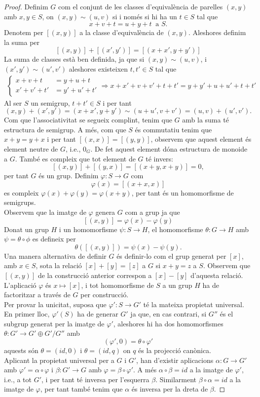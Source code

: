 \begin{proof}
Definim $G$ com el conjunt de les classes d'equivalència de parelles $(x,y)$ amb $x,y\in S$, on $(x,y) \sim (u,v)$ si i només si hi ha un $t\in S$ tal que 
$$
x+v+t = u+y+t \ \text{ a } S .
$$
Denotem per $ [(x,y)] $ a la classe d'equivalència de $(x,y)$. Aleshores definim la suma per
$$
[(x,y)]+[(x',y')]=[(x+x',y+y')]
$$
La suma de classes està ben definida, ja que si $(x,y)\sim (u,v)$,  i $(x',y') \sim (u',v')$ aleshores existeixen $t,t' \in S$ tal que 
\begin{eqnarray*}
\begin{cases}
x+v+t&=y+u+t \\ 
x'+v'+t'&=y'+u'+t'
\end{cases}
\Rightarrow 
x+x'+v+v'+t+t'=y+y'+u+u'+t+t'
\end{eqnarray*}
 Al ser $S$ un semigrup, $t+t'\in S$ i per tant
 $$(x,y)+(x',y')=(x+x',y+y')\sim (u+u',v+v') = (u,v)+(u',v').$$
\noindent Com que l'associativitat se segueix complint, tenim que $G$ amb la suma té estructura de semigrup. A més, com que $S$ és commutatiu tenim que $x+y=y+x$ i per tant $[(x,x)]=[(y,y)]$, observem que aquest element és element neutre de $G$, i.e., $0_G$. De fet aquest element dóna estructura de monoide a $G$.
També es compleix que tot element de $G$ té invers:
$$
[(x,y)]+ [(y,x)] = [(x+y,x+y)] = 0,
$$
per tant $G$ és un grup. Definim $\varphi: S\rightarrow G$ com
$$
\varphi(x)=[(x+x,x)]
$$
es compleix $\varphi(x)+\varphi(y)=\varphi(x+y)$, per tant és un homomorfisme de semigrups. 
\\ Observem que la imatge de $\varphi$ genera $G$ com a grup ja que 
$$
[(x,y)]=\varphi(x)-\varphi(y)
$$
 Donat un grup $H$ i un homomorfisme $\psi: S\rightarrow H$, el homomorfisme $\theta: G\rightarrow H$ amb $\psi = \theta \circ \phi$ es defineix per
$$
\theta([(x,y)])=\psi(x)-\psi(y).
$$
\indent  Una manera alternativa de definir $G$ és definir-lo com el grup generat per $[x]$, amb $x\in S$, sota la relació $[x]+[y]=[z]$ a $G$ si $x+y=z$ a $S$. Observem que $[(x,y)]$ de la construcció anterior correspon a $[x]-[y]$ d'aquesta relació. L'aplicació $\varphi$ és $x\mapsto [x]$, i tot homomorfisme de $S$ a un grup $H$ ha de factoritzar a través de $G$ per construcció. \\

Per provar la unicitat, suposa que $\varphi '  :  S \rightarrow G'$ té la mateixa propietat universal. En primer lloc, $\varphi ' (S)$ ha de generar $G'$ ja que, en cas contrari, si $G''$ és el subgrup generat per la imatge de $\varphi ' $, aleshores hi ha dos homomorfismes $\theta : G' \rightarrow G' \oplus G'/G''$ amb
$$
(\varphi ',0) = \theta \circ \varphi ' 
$$
aquests són $\theta = (id,0)$ i $\theta = (id,q)$ on $q$ és la projecció canònica. \\
Aplicant la propietat universal per a $G$ i $G'$, han d'existir aplicacions $\alpha :  G \rightarrow G'$ amb  $\varphi ' = \alpha \circ \varphi$ i $\beta: G'\rightarrow G$ amb  $\varphi = \beta \circ \varphi '$. 
A més $\alpha \circ \beta = id$ a la imatge de $\varphi'$, i.e., a tot $G'$, i per tant té inversa per l'esquerra $\beta$. Similarment $\beta \circ \alpha = id$ a la imatge de $\varphi$, per tant també tenim que $\alpha$ és inversa per la dreta de $\beta$.
 \end{proof}
